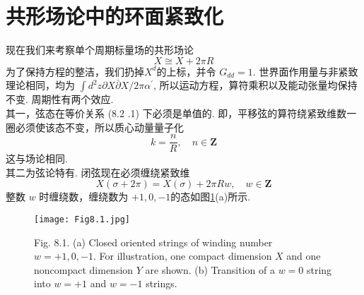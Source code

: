 \section{共形场论中的环面紧致化}%
现在我们来考察单个周期标量场的共形场论
\begin{equation}
	X \cong X+2 \pi R
\end{equation}
为了保持方程的整洁，我们扔掉$X^{d}$的上标，并令 $G_{d d}=1$. 世界面作用量与非紧致理论相同，均为 $\int d^{2} z \partial X \bar{\partial} X / 2 \pi \alpha^{\prime}$, 所以运动方程，算符乘积以及能动张量均保持不变. 周期性有两个效应. \\
其一，弦态在等价关系 (8.2 .1) 下必须是单值的. 即，平移弦的算符绕紧致维数一圈必须使该态不变，所以质心动量量子化
\begin{equation}
	k=\frac{n}{R}, \quad n \in \mathbf{Z}
\end{equation}
这与场论相同.\\
其二为弦论特有. 闭弦现在必须缠绕紧致维
\begin{equation}
	X(\sigma+2 \pi)=X(\sigma)+2 \pi R w, \quad w \in \mathbf{Z}
\end{equation}
整数 $w$ 时缠绕数，缠绕数为 $+1, 0 ,-1$的态如图\ref{Fig8.1}(a)所示.\\ 

\begin{figure}
	\begin{center}
		\texttt{[image: Fig8.1.jpg]}\\
		\caption{Fig. 8.1. (a) Closed oriented strings of winding number $w=+1,0,-1$. For illustration, one compact dimension $X$ and one noncompact dimension $Y$ are shown. (b) Transition of a $w=0$ string into $w=+1$ and $w=-1$ strings.}\label{Fig8.1}
	\end{center}
\end{figure}

